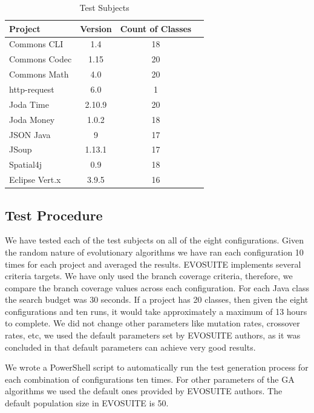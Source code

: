 \documentclass[sigconf]{acmart}
\begin{document}
\begin{table}[t]
  \caption{Test Subjects}
  \label{tab:subjects}
  \begin{tabular}{lccc}
    \toprule
    Project&Version&Count of Classes\\
    \midrule
    Commons CLI   & 1.4    & 18\\
    Commons Codec & 1.15   & 20 \\
    Commons Math  & 4.0    & 20\\
    http-request  & 6.0    & 1 \\
    Joda Time     & 2.10.9 & 20\\
    Joda Money    & 1.0.2  & 18\\
    JSON Java     & 9      & 17\\
    JSoup         & 1.13.1 & 17\\
    Spatial4j     & 0.9    & 18\\
    Eclipse Vert.x& 3.9.5  & 16\\
    \bottomrule
  \end{tabular}
\end{table}


\subsection{Test Procedure}
\label{testproc}
We have tested each of the test subjects on all of the eight configurations. Given the random nature 
of evolutionary algorithms we have ran each configuration 10 times for each project and averaged 
the results. EVOSUITE implements several criteria targets. We have only used the branch coverage 
criteria, therefore, we compare the branch coverage values across each configuration. For each Java 
class the search budget was 30 seconds. If a project has 20 classes, then given the eight 
configurations and ten runs, it would take approximately a maximum of 13 hours to complete. We did 
not change other parameters like mutation rates, crossover rates, etc, we used 
the default parameters set by EVOSUITE authors, as it was concluded in \cite{Tuning13} that default parameters
can achieve very good results.

We wrote a PowerShell script to automatically run the test generation process for each combination of
configurations ten times. For other parameters of the GA algorithms we used the default ones provided 
by EVOSUITE authors. The default population size in EVOSUITE is 50.
\end{document}
